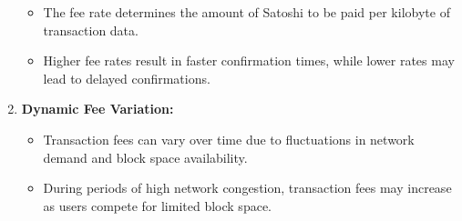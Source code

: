 \documentclass{report}
\begin{document}
\begin{enumerate}
\begin{itemize}
		\item The fee rate determines the amount of Satoshi to be paid per kilobyte of transaction data.
		\item Higher fee rates result in faster confirmation times, while lower rates may lead to delayed confirmations.
	\end{itemize}
	\item \textbf{Dynamic Fee Variation:}
		\begin{itemize}
		\item Transaction fees can vary over time due to fluctuations in network demand and block space availability.
		\item During periods of high network congestion, transaction fees may increase as users compete for limited block space.
	\end{itemize}
\end{enumerate}
\end{document}
